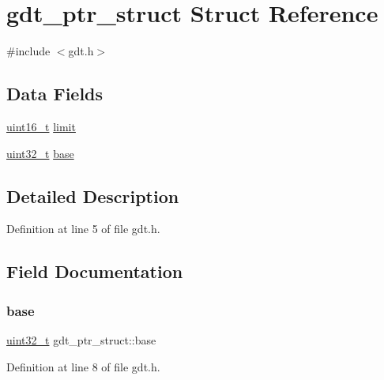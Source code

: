\hypertarget{a00138}{}\section{gdt\+\_\+ptr\+\_\+struct Struct Reference}
\label{a00138}


{\ttfamily \#include $<$gdt.\+h$>$}

\subsection*{Data Fields}
\begin{DoxyCompactItemize}
\item 
\hyperlink{a00092_a273cf69d639a59973b6019625df33e30_a273cf69d639a59973b6019625df33e30}{uint16\+\_\+t} \hyperlink{a00138_abf557ff0ca1cf3e130e8ab0086ab4ce6_abf557ff0ca1cf3e130e8ab0086ab4ce6}{limit}
\item 
\hyperlink{a00092_a435d1572bf3f880d55459d9805097f62_a435d1572bf3f880d55459d9805097f62}{uint32\+\_\+t} \hyperlink{a00138_a9b351f31bc261f3c2c3a87252350fb9c_a9b351f31bc261f3c2c3a87252350fb9c}{base}
\end{DoxyCompactItemize}


\subsection{Detailed Description}


Definition at line 5 of file gdt.\+h.



\subsection{Field Documentation}
\mbox{\label{a00138_a9b351f31bc261f3c2c3a87252350fb9c_a9b351f31bc261f3c2c3a87252350fb9c}} 
\subsubsection{\texorpdfstring{base}{base}}
{\footnotesize\ttfamily \hyperlink{a00092_a435d1572bf3f880d55459d9805097f62_a435d1572bf3f880d55459d9805097f62}{uint32\+\_\+t} gdt\+\_\+ptr\+\_\+struct\+::base}



Definition at line 8 of file gdt.\+h.


